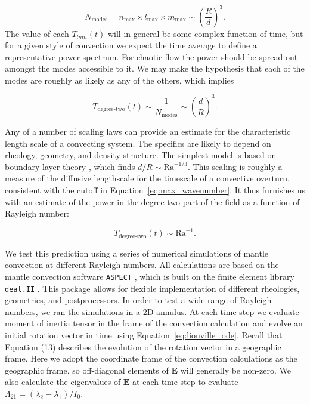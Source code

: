 \documentclass[preprint,12pt,authoryear]{elsarticle}
\begin{document}
\begin{equation}
N_{\text{modes}} = n_{\text{max}} \times l_{\text{max}} \times m_{\text{max}} \sim \left( \frac{R}{d} \right)^{3}.
\end{equation}
The value of each $T_{lmn}(t)$ will in general be some complex function of time, but for a given style of convection we expect the time average to define a representative power spectrum.
For chaotic flow the power should be spread out amongst the modes accessible to it.
We may make the hypothesis that each of the modes are roughly as likely as any of the others, which implies

\begin{equation}
T_{\text{degree-two}}(t) \sim \frac{1}{N_{\text{modes}}} \sim \left( \frac{d}{R}\right)^3.
\label{eq:degree_two_of_lengthscale}
\end{equation}

Any of a number of scaling laws can provide an estimate for the characteristic length scale of a convecting system. The specifics are likely to depend on rheology, geometry, and density structure.
The simplest model is based on boundary layer theory \citep{turcotte1967finite}, which finds $d/R \sim \mathrm{Ra}^{-1/3}$.
This scaling is roughly a measure of the diffusive lengthscale for the timescale of a convective overturn, consistent
with the cutoff in Equation~\eqref{eq:max_wavenumber}.
It thus furnishes us with an estimate of the power in 
the degree-two part of the field as a function of Rayleigh number:

\begin{equation}
T_{\text{degree-two}}(t) \sim \mathrm{Ra}^{-1}.
\label{eq:degree_two_of_ra}
\end{equation}

We test this prediction using a series of numerical simulations of mantle convection at different Rayleigh numbers. 
All calculations are based on the mantle convection software \texttt{ASPECT} \citep{kronbichler2012high}, which is built on the finite element library \texttt{deal.II} \citep{dealII82}. This package
 allows for flexible implementation of different rheologies, geometries, and postprocessors.
In order to test a wide range of Rayleigh numbers, we ran the simulations in a 2D annulus. At each time step we evaluate moment of inertia tensor in the frame of the convection calculation and evolve an initial rotation vector in time using  Equation~\eqref{eq:liouville_ode}. Recall that Equation (13) describes the evolution of the rotation vector in a geographic frame. Here we adopt the coordinate frame of the convection calculations as the geographic frame, so off-diagonal elements of $\mathbf{E}$ will generally be non-zero. We also calculate the eigenvalues of $\mathbf{E}$ at each time step to evaluate $\Lambda_{21} = (\lambda_2 - \lambda_1)/I_0$.
\end{document}
